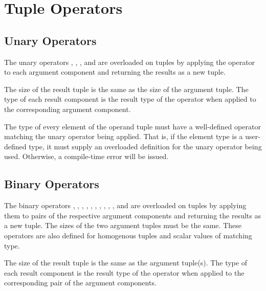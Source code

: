 \section{Tuple Operators}
\label{Tuple_Operators}

\subsection{Unary Operators}
\label{Tuple_Unary_Operators}

The unary operators \chpl{\+}, \chpl{\-}, \chpl{\~}, and \chpl{\!} are
overloaded on tuples by applying the operator to each argument component
and returning the results as a new tuple.

The size of the result tuple is the same as the size of the
argument tuple. The type of each result component is the result
type of the operator when applied to the corresponding argument component.

The type of every element of the operand tuple must have a
well-defined operator matching the unary operator being applied.  That
is, if the element type is a user-defined type, it must supply an
overloaded definition for the unary operator being used.  Otherwise, a
compile-time error will be issued.

\subsection{Binary Operators}
\label{Tuple_Binary_Operators}

The binary operators \chpl{\+}, \chpl{\-}, \chpl{\*}, \chpl{\/}, \chpl{\%},
\chpl{\*\*}, \chpl{\&}, \chpl{\|}, \chpl{\^}, \chpl{\<\<}, and \chpl{\>\>}
are overloaded on tuples by applying them to pairs of the respective
argument components and returning the results as a new tuple.  The
sizes of the two argument tuples must be the same.  These operators
are also defined for homogenous tuples and scalar values of matching
type.

The size of the result tuple is the same as the argument tuple(s).
The type of each result component is the result type of the operator
when applied to the corresponding pair of the argument components.

